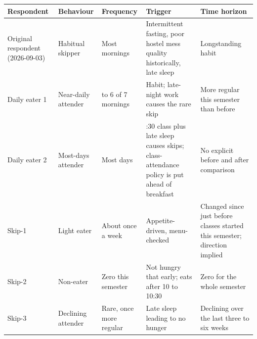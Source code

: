 \documentclass[
  10pt,
  table]{article}
\newcounter{none} %
\begin{document}
{\def\LTcaptype{none} %
\begin{longtable}[]{@{}
  >{\raggedright\arraybackslash}p{}
  >{\raggedright\arraybackslash}p{}
  >{\raggedright\arraybackslash}p{}
  >{\raggedright\arraybackslash}p{}
  >{\raggedright\arraybackslash}p{}@{}}
\toprule\noalign{}
\begin{minipage}[b]{\linewidth}\raggedright
\cellcolor{pblue}\color{white}\bfseries Respondent
\end{minipage} & \begin{minipage}[b]{\linewidth}\raggedright
\cellcolor{pblue}\color{white}\bfseries Behaviour
\end{minipage} & \begin{minipage}[b]{\linewidth}\raggedright
\cellcolor{pblue}\color{white}\bfseries Frequency
\end{minipage} & \begin{minipage}[b]{\linewidth}\raggedright
\cellcolor{pblue}\color{white}\bfseries Trigger
\end{minipage} & \begin{minipage}[b]{\linewidth}\raggedright
\cellcolor{pblue}\color{white}\bfseries Time horizon
\end{minipage} \\
\midrule\noalign{}
\endhead
\bottomrule\noalign{}
\endlastfoot
Original respondent (2026-09-03) & Habitual skipper & Most mornings & Intermittent fasting, poor hostel mess quality historically, late sleep & Longstanding habit \\
Daily eater 1 & Near-daily attender & 5 to 6 of 7 mornings & Habit; late-night work causes the rare skip & More regular this semester than before \\
Daily eater 2 & Most-days attender & Most days & 8:30 class plus late sleep causes skips; class-attendance policy is put ahead of breakfast & No explicit before and after comparison \\
Skip-1 & Light eater & About once a week & Appetite-driven, menu-checked & Changed since just before classes started this semester; direction implied \\
Skip-2 & Non-eater & Zero this semester & Not hungry that early; eats after 10 to 10:30 & Zero for the whole semester \\
Skip-3 & Declining attender & Rare, once more regular & Late sleep leading to no hunger & Declining over the last three to six weeks \\
\end{longtable}
}
\end{document}
